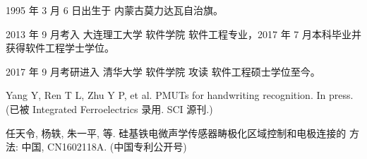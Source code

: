 
\begin{resume}


  1995 年 3 月 6 日出生于 内蒙古莫力达瓦自治旗。

  2013 年 9 月考入 大连理工大学 软件学院 软件工程专业，2017 年 7 月本科毕业并获得软件工程学士学位。

  2017 年 9 月考研进入 清华大学 软件学院 攻读 软件工程硕士学位至今。



  \begin{publications}[before=\publicationskip,after=\publicationskip]
    \item Yang Y, Ren T L, Zhu Y P, et al. PMUTs for handwriting recognition. In
      press. (已被 Integrated Ferroelectrics 录用. SCI 源刊.)
  \end{publications}


  \begin{achievements}
    \item 任天令, 杨轶, 朱一平, 等. 硅基铁电微声学传感器畴极化区域控制和电极连接的
      方法: 中国, CN1602118A. (中国专利公开号)
  \end{achievements}

\end{resume}
